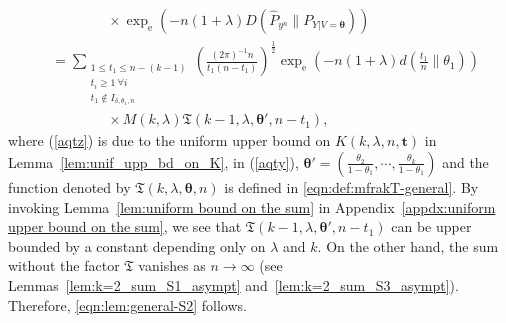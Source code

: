 \documentclass[journal, 10pt]{IEEEtran}
\newcommand{\rme}{\mathrm{e}}
\newcommand{\mfrakT}{\mathfrak{T}}
\theoremstyle{plain}
\theoremstyle{plain}
\theoremstyle{plain}
\theoremstyle{plain}
\newcommand{\boldtheta}{\mathbold{\theta}}
\newcommand{\boldt}{\mathbold{t}}
\begin{document}
\begin{appendices}
\begin{IEEEproof}
\begin{align}
& \qquad \qquad \times \exp_\rme(-n(1+\lambda)D(\widehat{P}_{y^n}\| P_{Y|V=\boldtheta})) \label{aqtz}\\
&=
\sum_{\substack{ 1\le t_1 \le n-(k-1) \\ t_i\ge 1 \ \forall i \\ t_1 \not \in I_{\delta, \theta_1, n} }} 
\left(\frac{ (2\pi)^{-1} n  }{ t_1(n-t_1)}\right)^\frac12 \exp_\rme(-n(1+\lambda) d(\tfrac{t_1}{n}\|\theta_1))  \nonumber  \\ 
&\qquad \qquad \times M(k, \lambda) \mfrakT(k-1, \lambda, \boldtheta', n-t_1)\text{,}  
  \label{aqty}
\end{align}
where (\ref{aqtz}) is due to the uniform upper bound on $K(k, \lambda, n, \boldt) $ in Lemma~\ref{lem:unif_upp_bd_on_K}, in (\ref{aqty}), $\boldtheta'= \left( \frac{\theta_2}{1-\theta_1}, \cdots, \frac{\theta_k}{1-\theta_1} \right) $ and the function denoted by $\mfrakT(k, \lambda, \boldtheta, n) $ is defined in \eqref{eqn:def:mfrakT-general}. By invoking Lemma~\ref{lem:uniform bound on the sum} in Appendix~\ref{appdx:uniform upper bound on the sum}, we see that $\mfrakT(k-1, \lambda, \boldtheta', n-t_1) $ can be upper bounded by a constant depending only on $\lambda$ and $k$. On the other hand, the sum without the factor $\mfrakT $ vanishes as $ n\to \infty $ (see Lemmas~\ref{lem:k=2_sum_S1_asympt} and~\ref{lem:k=2_sum_S3_asympt}). Therefore, \eqref{eqn:lem:general-S2} follows.  
\end{IEEEproof} 

\end{appendices}
\end{document}
